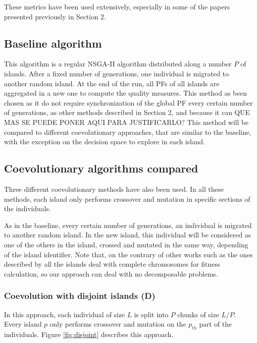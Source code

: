 \documentclass[Afour,sageh,times]{sagej}
\begin{document}
These metrics have been used extensively, especially in some of the papers presented previously in Section 2.


\subsection{Baseline algorithm}

This algorithm is a regular NSGA-II algorithm distributed along a number $P$ of islands. After a fixed number of generations, one individual is migrated to another random island. At the end of the run, all PFs of all islands are aggregated in a new one to compute the quality measures. This method as been chosen as it do not require synchronization of the global PF every certain number of generations, as other methods described in Section 2, and because it can {\color{red} QUE MAS SE PUEDE PONER AQUI PARA JUSTIFICARLO?}
%
This method will be compared to different coevolutionary approaches, that are similar to the baseline, with the exception on the decision space to explore in each island.
\subsection{Coevolutionary algorithms compared}
Three different coevolutionary methods have also been used. In all these methods, each island only performs crossover and mutation in specific sections of the individuals.

As in the baseline, every certain number of generations, an individual is migrated to another random island.  In the new island, this individual will be considered as one of the others in the island, crossed and mutated in the same way, depending of the island identifier. Note that, on the contrary of other works such as the ones described by \cite{Talbi08Parallel} all the islands deal with complete chromosomes for fitness calculation, so our approach can deal with no decomposable problems. 

\subsubsection{Coevolution with disjoint islands (D)} 
In this approach, each individual of size $L$ is split into $P$ chunks of size $L/P$. Every island $p$ only performs crossover and mutation on the $p_{th}$ part of the individuals. Figure \ref{fig:disjoint} describes this approach.  
\end{document}
